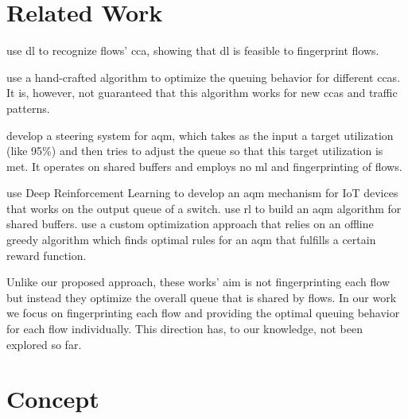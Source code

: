 \documentclass[conference]{IEEEtran}
\begin{document}
\section{Related Work}

\cite{sander_deepcci_2019} use \gls{dl} to recognize flows' \gls{cca}, showing that \gls{dl} is feasible to fingerprint flows. 

\cite{bachl_cocoa_2019} use a hand-crafted algorithm to optimize the queuing behavior for different \glspl{cca}. It is, however, not guaranteed that this algorithm works for new \glspl{cca} and traffic patterns. 

\cite{bless_policy-oriented_2018} develop a steering system for \gls{aqm}, which takes as the input a target utilization (like 95\%) and then tries to adjust the queue so that this target utilization is met. It operates on shared buffers and employs no \gls{ml} and fingerprinting of flows. 

\cite{kim_deep_2019} use Deep Reinforcement Learning to develop an \gls{aqm} mechanism for IoT devices that works on the output queue of a switch. \cite{bisoy_design_2017} use \gls{rl} to build an \gls{aqm} algorithm for shared buffers. \cite{lin_kemy_2015} use a custom optimization approach that relies on an offline greedy algorithm which finds optimal rules for an \gls{aqm} that fulfills a certain reward function. 

Unlike our proposed approach, these works' aim is not fingerprinting each flow but instead they optimize the overall queue that is shared by flows. In our work we focus on fingerprinting each flow and providing the optimal queuing behavior for each flow individually. This direction has, to our knowledge, not been explored so far. 


\section{Concept}
\label{sec:concept}
\end{document}

